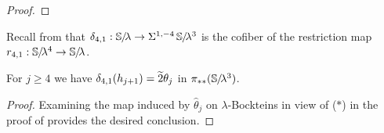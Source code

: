 \begin{proof}
\end{proof}

Recall from  that $\delta_{4,1}: \operatorname{\mathbb{S}}\hspace{-2.2pt}/\!\lambda \rightarrow \Sigma^{1, -4}\operatorname{\mathbb{S}}\hspace{-2.2pt}/\!\lambda^{3}$ is the cofiber of the restriction map $r_{4,1}: \operatorname{\mathbb{S}}\hspace{-2.2pt}/\!\lambda^4 \rightarrow \operatorname{\mathbb{S}}\hspace{-2.2pt}/\!\lambda$.


\begin{cor} \label{cor:Hopf-diff}
  For $j \geq 4$ we have $\delta_{4,1}(h_{j+1}) = \wt{2} \theta_{j}$ in $\pi_{**}(\operatorname{\mathbb{S}}\hspace{-2.2pt}/\!\lambda^3)$.
\end{cor}

\begin{proof}
  Examining the map induced by $\widehat{\theta}_j$ on $\lambda$-Bockteins in view of ($*$) in the proof of  provides the desired conclusion.
\end{proof}

